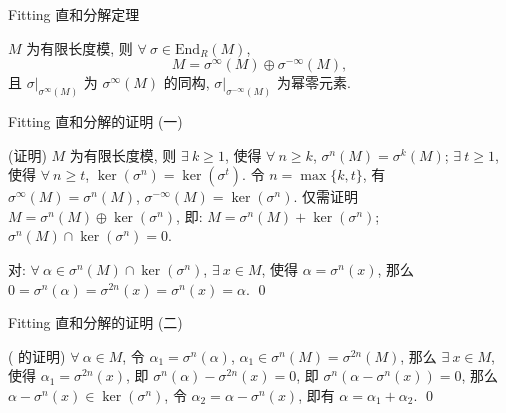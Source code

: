 
\begin{frame}{Fitting 直和分解定理}

\begin{lem}
$M$ 为有限长度模, 则 $\forall\ \sigma \in \mathrm{End}_R(M)$,
\[
M = \sigma^{\infty}(M) \oplus \sigma^{-\infty}(M),
\]
且 $\sigma|_{\sigma^{\infty}(M)}$ 为 $\sigma^{\infty}(M)$ 的同构,
$\sigma|_{\sigma^{-\infty}(M)}$ 为幂零元素.
\end{lem}

\end{frame}


\begin{frame}{Fitting 直和分解的证明 (一)}

\startproof[bg=yellow, fg=red](证明)
$M$ 为有限长度模, 则
$\exists\ k \geq 1$, 使得 $\forall\ n \geq k$, $\sigma^n(M) = \sigma^k(M)$;
$\exists\ t \geq 1$, 使得 $\forall\ n \geq t$, $\ker(\sigma^n) = \ker(\sigma^t)$.
令 $n = \max\{ k, t \}$, 有 $\sigma^{\infty}(M) = \sigma^n(M)$,
$\sigma^{-\infty}(M) = \ker(\sigma^n)$.
仅需证明 $M = \sigma^n(M) \oplus \ker(\sigma^n)$, 即:
 $M = \sigma^n(M) + \ker(\sigma^n)$;
 $\sigma^n(M) \cap \ker(\sigma^n) = 0$.

\pause

对: $\forall\ \alpha \in \sigma^n(M) \cap \ker(\sigma^n)$,
$\exists\ x \in M$, 使得 $\alpha = \sigma^n(x)$,
那么 $0 = \sigma^n(\alpha) = \sigma^{2n}(x) = \sigma^n(x) = \alpha$.
\qed

\end{frame}


\begin{frame}{Fitting 直和分解的证明 (二)}

\startproof[bg=yellow, fg=red]( 的证明)
$\forall\ \alpha \in M$, 令 $\alpha_1 = \sigma^n(\alpha)$,
$\alpha_1 \in \sigma^n(M) = \sigma^{2n}(M)$,
那么 $\exists\ x \in M$, 使得 $\alpha_1 = \sigma^{2n}(x)$,
即 $\sigma^n(\alpha) - \sigma^{2n}(x) = 0$,
即 $\sigma^n(\alpha - \sigma^n(x)) = 0$,
那么 $\alpha - \sigma^n(x) \in \ker(\sigma^n)$,
令 $\alpha_2 = \alpha - \sigma^n(x)$, 即有 $\alpha = \alpha_1 + \alpha_2$.
\qed

\end{frame}


